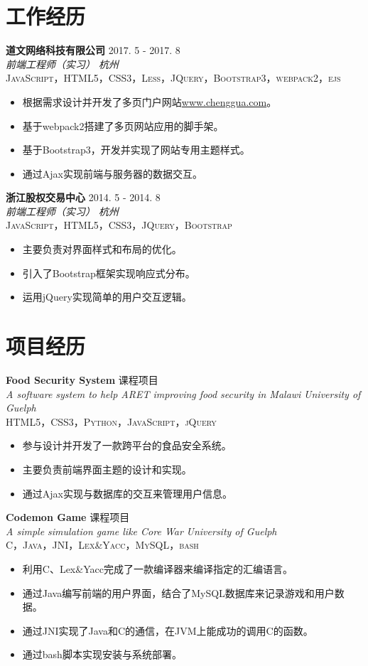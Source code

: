 \documentclass[10pt, letterpaper]{article}
\newcommand{\project}[6]{
	\noindent
    \textbf{\color{darktext}#1} \hfill {#2} \\
    \textit{\color{hardtext}#3} \hfill \textit{\color{awesome-emerald}#4}\\
    \textsc{#5}
    {#6}
    \vspace{10pt}
}
\begin{document}

\section*{工作经历}

\project{道文网络科技有限公司}{2017. 5 - 2017. 8}
{前端工程师（实习）}{杭州}
{JavaScript，HTML5，CSS3，Less，JQuery，Bootstrap3，webpack2，ejs}
{\begin{itemize}[leftmargin=*]
  	\item 根据需求设计并开发了多页门户网站\href{www.chenggua.com}{www.chenggua.com}。
  	\item 基于webpack2搭建了多页网站应用的脚手架。
    \item 基于Bootstrap3，开发并实现了网站专用主题样式。
    \item 通过Ajax实现前端与服务器的数据交互。
\end{itemize}}

\project{浙江股权交易中心}{2014. 5 - 2014. 8}
{前端工程师（实习）}{杭州}
{JavaScript，HTML5，CSS3，JQuery，Bootstrap}
{\begin{itemize}[leftmargin=*]
    \item 主要负责对界面样式和布局的优化。
    \item 引入了Bootstrap框架实现响应式分布。
    \item 运用jQuery实现简单的用户交互逻辑。
\end{itemize}}

\section*{项目经历}

\project{Food Security System}{课程项目}
{A software system to help ARET improving food security in Malawi}{University of Guelph}
{HTML5，CSS3，Python，JavaScript，jQuery}
{\begin{itemize}[leftmargin=*]
    \item 参与设计并开发了一款跨平台的食品安全系统。
    \item 主要负责前端界面主题的设计和实现。
    \item 通过Ajax实现与数据库的交互来管理用户信息。
\end{itemize}}

\project{Codemon Game}{课程项目}
{A simple simulation game like Core War}{University of Guelph}
{C，Java，JNI，Lex\&Yacc，MySQL，bash}
{\begin{itemize}[leftmargin=*]
    \item 利用C、Lex\&Yacc完成了一款编译器来编译指定的汇编语言。
    \item 通过Java编写前端的用户界面，结合了MySQL数据库来记录游戏和用户数据。
    \item 通过JNI实现了Java和C的通信，在JVM上能成功的调用C的函数。
    \item 通过bash脚本实现安装与系统部署。
\end{itemize}}
\end{document}
